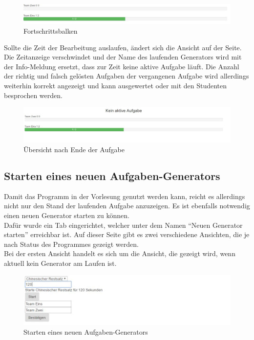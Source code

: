 \begin{figure}[htp]     %
\centering
\includegraphics[width=1\textwidth]{bilder/Bars} 
\caption[Fortschrittsbalken]{Fortschrittsbalken}
\end{figure} 

Sollte die Zeit der Bearbeitung auslaufen, ändert sich die Ansicht auf der Seite. Die Zeitanzeige verschwindet und der Name des laufenden Generators wird mit der Info-Meldung ersetzt, dass zur Zeit keine aktive Aufgabe läuft. Die Anzahl der richtig und falsch gelösten Aufgaben der vergangenen Aufgabe wird allerdings weiterhin korrekt angezeigt und kann ausgewertet oder mit den Studenten besprochen werden.

\begin{figure}[htp]     %
\centering
\includegraphics[width=1\textwidth]{bilder/TaskOver} 
\caption[Übersicht nach Ende der Aufgabe]{Übersicht nach Ende der Aufgabe}
\end{figure} 


\subsection{Starten eines neuen Aufgaben-Generators}

Damit das Programm in der Vorlesung genutzt werden kann, reicht es allerdings nicht nur den Stand der laufenden Aufgabe anzuzeigen. Es ist ebenfalls notwendig einen neuen Generator starten zu können. \\
Dafür wurde ein Tab eingerichtet, welcher unter dem Namen ``Neuen Generator starten'' erreichbar ist.
Auf dieser Seite gibt es zwei verschiedene Ansichten, die je nach Status des Programmes gezeigt werden. \\

Bei der ersten Ansicht handelt es sich um die Ansicht, die gezeigt wird, wenn aktuell kein Generator am Laufen ist. \\

\begin{figure}[htp]     %
\centering
\includegraphics[width=1\textwidth]{bilder/StartNew} 
\caption[Starten eines neuen Aufgaben-Generators]{Starten eines neuen Aufgaben-Generators}
\end{figure} 

